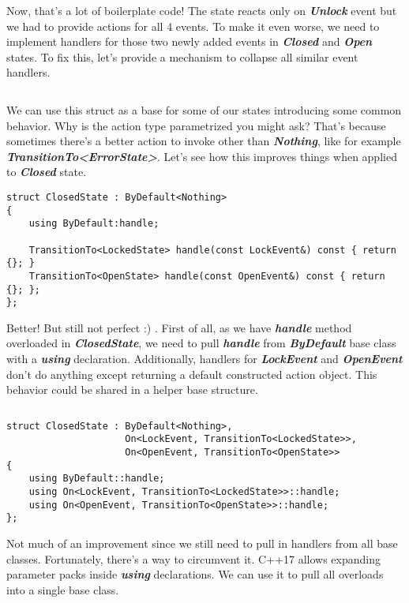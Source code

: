 \documentclass{article}[8pt]
\newcommand{\code}[1]{\textbf{\textit{#1}}}
\newcommand{\closed}{\code{Closed}}
\newcommand{\open}{\code{Open}}
\newcommand{\unlock}{\code{Unlock}}
\begin{document}
Now, that's a lot of boilerplate code! The state reacts only on \unlock{} event but we had to provide actions for all 4 events. To make it even worse, we need to implement handlers for those two newly added events in \closed{} and \open{} states. To fix this, let's provide a mechanism to collapse all similar event handlers.

\bigskip
\inputminted[firstline=3]{c++}{../fsm/actions/ByDefault.h}
\bigskip

We can use this struct as a base for some of our states introducing some common behavior. Why is the action type parametrized you might ask? That's because sometimes there's a better action to invoke other than \code{Nothing}, like for example
\\\code{TransitionTo<ErrorState>}. Let's see how this improves things when applied to \closed{} state.

\bigskip
\begin{verbatim}
struct ClosedState : ByDefault<Nothing>
{
	using ByDefault:handle;

	TransitionTo<LockedState> handle(const LockEvent&) const { return {}; }
	TransitionTo<OpenState> handle(const OpenEvent&) const { return {}; };
};
\end{verbatim}
\bigskip

Better! But still not perfect :) . First of all, as we have \code{handle} method overloaded in \code{ClosedState}, we need to pull \code{handle} from \code{ByDefault} base class with a \code{using} declaration.
Additionally, handlers for \code{LockEvent} and \code{OpenEvent} don't do anything except returning a default constructed action object. This behavior could be shared in a helper base structure.

\bigskip
\inputminted[firstline=3]{c++}{../fsm/actions/On.h}
\bigskip
\begin{verbatim}
struct ClosedState : ByDefault<Nothing>,
					 On<LockEvent, TransitionTo<LockedState>>,
					 On<OpenEvent, TransitionTo<OpenState>>
{
	using ByDefault::handle;
	using On<LockEvent, TransitionTo<LockedState>>::handle;
	using On<OpenEvent, TransitionTo<OpenState>>::handle;
};
\end{verbatim}
\bigskip

Not much of an improvement since we still need to pull in handlers from all base classes. Fortunately, there's a way to circumvent it. C++17 allows expanding parameter packs inside \code{using} declarations. We can use it to pull all overloads into a single base class.
\end{document}
